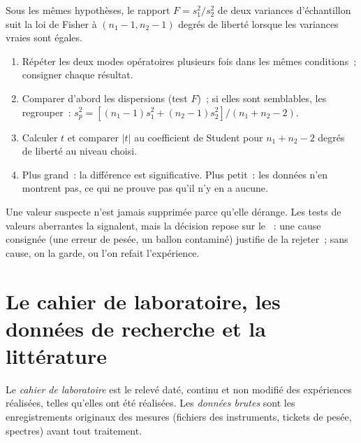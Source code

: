 \begin{proposition}[Test $F$]\label{prop:b3:lab-techniques-3:f-test}
Sous les mêmes hypothèses, le rapport $F = s_1^2/s_2^2$ de deux variances d'échantillon suit
la loi de Fisher à $(n_1 - 1, n_2 - 1)$ degrés de liberté lorsque les variances vraies sont égales.
\admitted
\end{proposition}

\begin{method}\label{met:b3:lab-techniques-3:compare-means}
\begin{enumerate}
  \item Répéter les deux modes opératoires plusieurs fois dans les mêmes
        conditions~; consigner chaque résultat.
  \item Comparer d'abord les dispersions (test $F$)~; si elles sont semblables, les regrouper~:
        $s_p^2 = [(n_1 - 1)s_1^2 + (n_2 - 1)s_2^2]/(n_1 + n_2 - 2)$.
  \item Calculer $t$ et comparer $|t|$ au coefficient de Student pour $n_1 + n_2 - 2$ degrés de
        liberté au niveau choisi.
  \item Plus grand~: la différence est significative. Plus petit~: les
        données n'en montrent pas, ce qui ne prouve pas qu'il n'y en a
        aucune.
\end{enumerate}
\end{method}

Une valeur suspecte n'est jamais supprimée parce qu'elle dérange. Les tests
de valeurs aberrantes la signalent, mais la décision repose sur le ~: une cause consignée (une erreur de pesée, un ballon
contaminé) justifie de la rejeter~; sans cause, on la garde, ou l'on
refait l'expérience.

\section{Le cahier de laboratoire, les données de recherche et la littérature}

\begin{definition}\label{def:b3:lab-techniques-3:notebook}
Le \emph{cahier de laboratoire} est le relevé
daté, continu et non modifié des expériences réalisées, telles qu'elles
ont été réalisées. Les \emph{données brutes} sont les
enregistrements originaux des mesures (fichiers des instruments, tickets
de pesée, spectres) avant tout traitement.
\end{definition}

